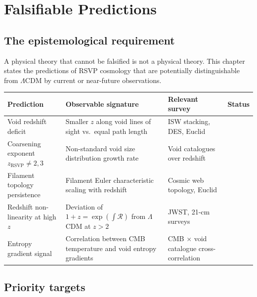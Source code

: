 
\chapter{Falsifiable Predictions}
\label{ch:falsifiable-predictions}

\section{The epistemological requirement}

A physical theory that cannot be falsified is not a physical
theory.
This chapter states the predictions of RSVP cosmology that
are potentially distinguishable from $\Lambda$CDM by current
or near-future observations.

\begin{center}
\small
\begin{tabular}{@{}p{3cm}p{3.5cm}p{3cm}p{2cm}@{}}
\toprule
\textbf{Prediction}
& \textbf{Observable signature}
& \textbf{Relevant survey}
& \textbf{Status} \\
\midrule
Void redshift deficit
& Smaller $z$ along void lines of sight vs.\ equal path length
& ISW stacking, DES, Euclid
& \statusconjectured{} \\
\addlinespace
Coarsening exponent $z_{\mathrm{RSVP}} \neq 2,3$
& Non-standard void size distribution growth rate
& Void catalogues over redshift
& \statusconjectured{} \\
\addlinespace
Filament topology persistence
& Filament Euler characteristic scaling with redshift
& Cosmic web topology, Euclid
& \statusconjectured{} \\
\addlinespace
Redshift non-linearity at high $z$
& Deviation of $1+z = \exp(\int\mathcal{R})$ from $\Lambda$CDM at $z > 2$
& JWST, 21-cm surveys
& \statusopen{} \\
\addlinespace
Entropy gradient signal
& Correlation between CMB temperature and void entropy gradients
& CMB $\times$ void catalogue cross-correlation
& \statusopen{} \\
\bottomrule
\end{tabular}
\end{center}

\section{Priority targets}

